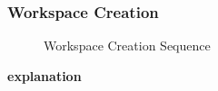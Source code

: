 \subsubsection{Workspace Creation}
\begin{figure}[!htb]
    \centering
    \caption{Workspace Creation Sequence}
    \label{fig:seq-desktop-workspace-create}
\end{figure}

\textbf{explanation}
\newpage

